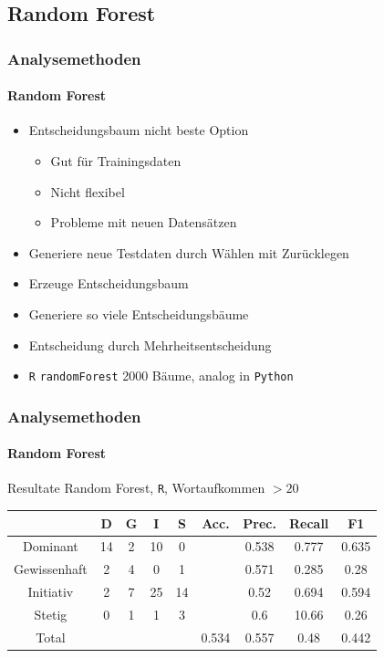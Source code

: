 \subsection{Random Forest}
\begin{frame}
\frametitle{Analysemethoden}
\framesubtitle{Random Forest}
\begin{itemize}\setlength\parskip{12pt}
\item Entscheidungsbaum nicht beste Option
\begin{itemize}
	\item Gut für Trainingsdaten
	\item Nicht flexibel 
	\item Probleme mit neuen Datensätzen
\end{itemize}
\item Generiere neue Testdaten durch Wählen mit Zurücklegen
\item Erzeuge Entscheidungsbaum
\item Generiere so viele Entscheidungsbäume
\item Entscheidung durch Mehrheitsentscheidung
\item \texttt{R} \texttt{randomForest} 2000 Bäume, analog in  \texttt{Python}
\end{itemize}
\end{frame}
\begin{frame}
\frametitle{Analysemethoden}
\framesubtitle{Random Forest}
Resultate Random Forest, \texttt{R}, Wortaufkommen $> 20$
\begin{center}
\begin{tabular}{|c|c|c|c|c|c|c|c|c|}
\hline
 &  D 	& G	& I & S	& Acc.	& Prec. & Recall	& F1\\
\hline
Dominant & 14 & 2 & 10& 0 &&0.538 & 0.777 & 0.635 \\
Gewissenhaft & 2 & 4 & 0 & 1&&0.571 & 0.285 & 0.28 \\
Initiativ & 2 & 7  & 25 & 14&&0.52 & 0.694 & 0.594 \\
Stetig & 0 & 1 & 1 &  3&&0.6 & 10.66 & 0.26 \\
\hline
Total 	&		&		& & 		& 0.534		&   0.557 & 0.48 & 0.442\\
\hline
\end{tabular}
\end{center}
\end{frame}
